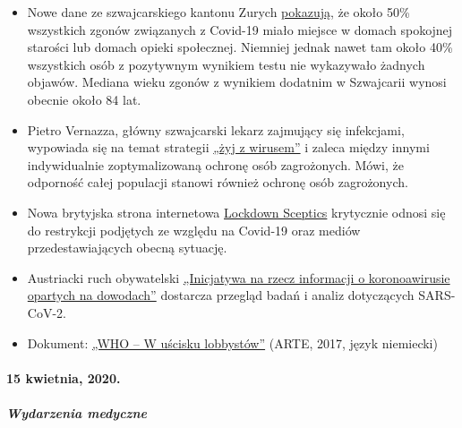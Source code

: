 \begin{itemize}
{  razy więcej osób} miało wirusa koronawirusa, niż pierwotnie sądzono,
  ponieważ nie wystąpiły u nich żadne symptomy lub występiły tylko
  łagodne objawy. Rzeczywisty wskaźnik odporności wynosi 22\%.
\item
  Nowe dane ze szwajcarskiego kantonu Zurych
  \href{https://www.srf.ch/news/regional/zuerich-schaffhausen/corona-uebersicht-zh-und-sh-schlieren-als-zentrum-der-forschung-im-kampf-gegen-corona}{pokazują},
  że około 50\% wszystkich zgonów związanych z Covid-19 miało miejsce w
  domach spokojnej starości lub domach opieki społecznej. Niemniej
  jednak nawet tam około 40\% wszystkich osób z pozytywnym wynikiem
  testu nie wykazywało żadnych objawów. Mediana wieku zgonów z wynikiem
  dodatnim w Szwajcarii wynosi obecnie około 84 lat.
\item
  Pietro Vernazza, główny szwajcarski lekarz zajmujący się infekcjami,
  wypowiada się na temat strategii
  \href{https://infekt.ch/2020/04/exitstrategie-lockdown/}{„żyj z
  wirusem''} i zaleca między innymi indywidualnie zoptymalizowaną
  ochronę osób zagrożonych. Mówi, że odporność całej populacji stanowi
  również ochronę osób zagrożonych.
\item
  Nowa brytyjska strona internetowa
  \href{https://lockdownsceptics.org/}{Lockdown Sceptics} krytycznie
  odnosi się do restrykcji podjętych ze względu na Covid-19 oraz mediów
  przedestawiających obecną sytuację.
\item
  Austriacki ruch obywatelski
  \href{https://www.initiative-corona.info/}{„Inicjatywa na rzecz
  informacji o koronoawirusie opartych na dowodach''} dostarcza przegląd
  badań i analiz dotyczących SARS-CoV-2.
\item
  Dokument: \href{https://www.youtube.com/watch?v=dYlia_fQOLk}{„WHO -- W
  uścisku lobbystów''} (ARTE, 2017, język niemiecki)
\end{itemize}

\hypertarget{15-kwietnia-2020}{%
\paragraph{15 kwietnia, 2020.}\label{15-kwietnia-2020}}

\hypertarget{wydarzenia-medyczne-3}{%
\subparagraph{\texorpdfstring{\textbf{Wydarzenia
medyczne}}{Wydarzenia medyczne}}\label{wydarzenia-medyczne-3}}

